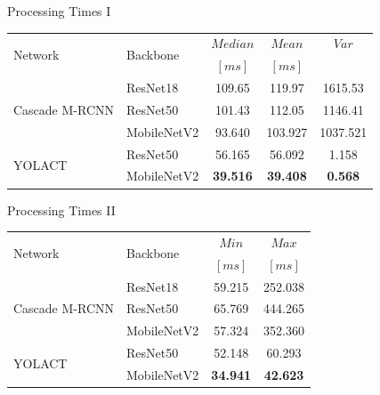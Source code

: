 \documentclass[18pt]{beamer}
\begin{document}
\begin{frame}{Processing Times I}
\begin{table}[h]
    \begin{tabular}{ll | ccc}
        \toprule
        \multirow{2}{*}{Network}        & \multicolumn{1}{l}{\multirow{2}{*}{Backbone}}  & $Median$  & $Mean$    & $Var$    \\
        \multirow{1}{*}{}               & \multicolumn{1}{l}{\multirow{1}{*}{}}  			& $[ms]$  	& $[ms]$    & 		     \\
        \midrule
        \multirow{3}{*}{Cascade M-RCNN} & ResNet18                      & 109.65    & 119.97    & 1615.53   \\
        \multirow{1}{*}{}               & ResNet50                      & 101.43    & 112.05    & 1146.41    \\
        \multirow{1}{*}{}               & MobileNetV2                   & 93.640    & 103.927   & 1037.521 \\
        \midrule
        \multirow{2}{*}{YOLACT}         & ResNet50                      & 56.165    & 56.092    & 1.158     \\
        \multirow{1}{*}{}               & MobileNetV2                   & \textbf{39.516} & \textbf{39.408} & \textbf{0.568}  \\
        \bottomrule
    \end{tabular}
\end{table}
\end{frame}

\begin{frame}{Processing Times II}
\begin{table}[h]
    \begin{tabular}{ll | cc}
        \toprule
        \multirow{2}{*}{Network}        & \multicolumn{1}{l}{\multirow{2}{*}{Backbone}}  & $Min$     & $Max$   \\
        \multirow{1}{*}{}               & \multicolumn{1}{l}{\multirow{1}{*}{}}  			& $[ms]$    & $[ms]$   \\
        \midrule
        \multirow{3}{*}{Cascade M-RCNN} & ResNet18                      & 59.215    & 252.038 \\
        \multirow{1}{*}{}               & ResNet50                     & 65.769    & 444.265   \\
        \multirow{1}{*}{}               & MobileNetV2                   & 57.324    & 352.360  \\
        \midrule
        \multirow{2}{*}{YOLACT}         & ResNet50                      & 52.148    & 60.293   \\
        \multirow{1}{*}{}               & MobileNetV2                   & \textbf{34.941} & \textbf{42.623}  \\
        \bottomrule
    \end{tabular}
\end{table}
\end{frame}
\end{document}

